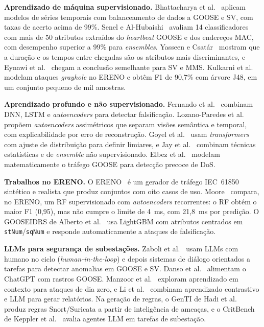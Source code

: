 \documentclass[12pt]{article}
\newcommand{\ataque}[1]{\textit{#1}}
\begin{document}
\textbf{Aprendizado de máquina supervisionado.} Bhattacharya et
al.~\cite{bhattacharya2024ml} aplicam modelos de séries temporais com
balanceamento de dados a GOOSE e SV, com taxas de acerto acima de 99\%. Senel e
Al-Hubaishi~\cite{senel2026simultaneous} avaliam 14 classificadores com mais de
50 atributos extraídos do \textit{heartbeat} GOOSE e dos endereços MAC, com
desempenho superior a 99\% para \textit{ensembles}. Yasseen e
Csatár~\cite{yasseen2026optimal,yasseen2025ml} mostram que a duração e os
tempos entre chegadas são os atributos mais discriminantes, e Eynawi et
al.~\cite{eynawi2024feature} chegam a conclusão semelhante para SV e MMS.
Kulkarni et al.~\cite{kulkarni2026grayhole} modelam ataques \ataque{grayhole}
no ERENO e obtêm F1 de 90,7\% com árvore J48, em um conjunto pequeno de mil
amostras.

\textbf{Aprendizado profundo e não supervisionado.} Fernando et
al.~\cite{fernando2025spoofing} combinam DNN, LSTM e \textit{autoencoders} para detectar
falsificação. Lozano-Paredes et al.~\cite{lozano2026explainable} propõem
\textit{autoencoders} assimétricos que separam visões semântica e temporal, com
explicabilidade por erro de reconstrução. Goyel et
al.~\cite{goyel2026transformer} usam \textit{transformers} com ajuste de
distribuição para definir limiares, e Jay et
al.~\cite{jay2022unsupervised,jay2025iidm} combinam técnicas estatísticas e de
\textit{ensemble} não supervisionado. Elbez et al.~\cite{elbez2024eda4gnet}
modelam matematicamente o tráfego GOOSE para detecção precoce de DoS.

\textbf{Trabalhos no ERENO.} O ERENO~\cite{quincozes2022ereno,quincozes2024ereno}
é um gerador de tráfego IEC~61850 sintético e realista que produz conjuntos com
oito casos de uso. Moore~\cite{moore2026anomaly} compara, no ERENO, um RF
supervisionado com \textit{autoencoders} recorrentes: o RF obtém o maior F1 (0,95), mas
não cumpre o limite de 4~ms, com 21,8~ms por predição. O GOOSEIDRS de Alberto et
al.~\cite{alberto2026gooseidrs} usa LightGBM com atributos centrados em
\texttt{stNum}/\texttt{sqNum} e responde automaticamente a ataques de
falsificação.

\textbf{LLMs para segurança de subestações.} Zaboli et
al.~\cite{zaboli2024chatgpt,zaboli2025genai} usam LLMs com humano no ciclo (\textit{human-in-the-loop}) e
depois sistemas de diálogo orientados a tarefas para detectar anomalias em GOOSE
e SV. Danso et al.~\cite{danso2025llm} alimentam o ChatGPT com rastros GOOSE.
Manzoor et al.~\cite{manzoor2024zeroday} exploram aprendizado em contexto para
ataques de dia zero, e Li et al.~\cite{li2025racl} combinam aprendizado
contrastivo e LLM para gerar relatórios. Na geração de regras, o GenTI de Hadi et
al.~\cite{hadi2026genti} produz regras Snort/Suricata a partir de
inteligência de ameaças, e o CritBench de Keppler et al.~\cite{keppler2026critbench}
avalia agentes LLM em tarefas de subestação. 
\end{document}
